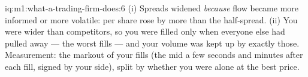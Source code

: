 \begin{solution}{iq:m1:what-a-trading-firm-does:6}
(i) Spreads widened \emph{because} flow became more informed or more
volatile:  per share rose by more than the half-spread.
(ii) You were wider than competitors, so you were filled only when everyone
else had pulled away --- the worst fills --- and your volume was kept up by
exactly those. Measurement: the markout of your fills (the mid a few seconds
and minutes after each fill, signed by your side), split by whether you were
alone at the best price.
\end{solution}
